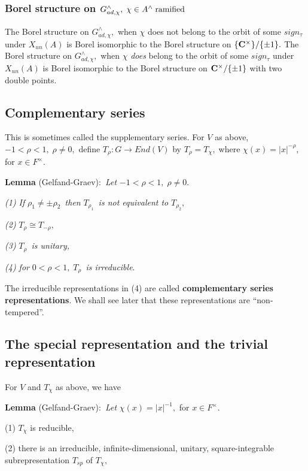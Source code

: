 \subsubsection{Borel structure on $G_{ad,\chi }^{\wedge },\;\chi \in
A^{\wedge }\;{\rm ramified}$}

The Borel structure on $G_{ad,\chi }^{\wedge },$ when $\chi $ does not
belong to the orbit of some $sign_\tau $ under $X_{un}(A)$ is Borel
isomorphic to the Borel structure on $\{{\bf C}^{\times }\}/\{\pm 1\}.$
The Borel structure on $G_{ad,\chi }^{\wedge },$ when $\chi $ {\em does}
belong to the orbit of some $sign_\tau $ under $X_{un}(A)$ is Borel
isomorphic to the Borel structure on ${\bf C}^{\times }/\{\pm 1\}$ with two
double points.

\subsection{Complementary series}

This is sometimes called the supplementary series. For $V$ as above, $%
-1<\rho <1,\;\rho \neq 0,$ define $T_\rho :G\rightarrow End(V)$ by $T_\rho
=T_\chi ,\;$where $\chi (x)=|x|^{-\rho },$ for $x\in F^{\times }.$

{\bf Lemma} (Gelfand-Graev):{\em \ Let }$-1<\rho <1,\;\rho \neq 0.$

{\em (1) If }$\rho _1\neq \pm \rho _2${\em \ then }$T_{\rho _1}${\em \ is
not equivalent to }$T_{\rho _2},$

{\em (2) }$T_\rho \cong T_{-\rho },$

{\em (3) }$T_\rho ${\em \ is unitary,}

{\em (4) for }$0<\rho <1,\;T_\rho ${\em \ is irreducible}$.$

The irreducible representations in (4) are called {\bf complementary series
representations}. We shall see later that these representations are
``non-tempered''.

\subsection{The special representation and the trivial representation}

For $V$ and $T_\chi $ as above, we have

{\bf Lemma} (Gelfand-Graev):{\em \ Let }$\chi (x)=|x|^{-1},$ for $x\in
F^{\times }.$

(1) $T_\chi $ is reducible,

(2) there is an irreducible, infinite-dimensional, unitary,
square-integrable subrepresentation $T_{sp}$ of $T_\chi ,$

